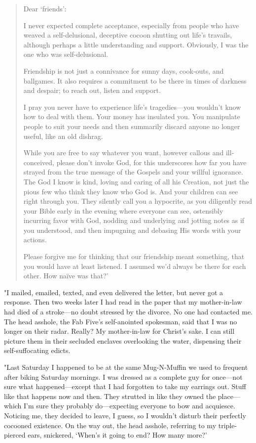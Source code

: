 \begin{quote}
Dear `friends':

I never expected complete acceptance, especially from people who have
weaved a self-delusional, deceptive cocoon shutting out life's travails,
although perhaps a little understanding and support. Obviously, I was
the one who was self-delusional.

Friendship is not just a connivance for sunny days, cook-outs, and
ballgames. It also requires a commitment to be there in times of
darkness and despair; to reach out, listen and support.

I pray you never have to experience life's tragedies---you wouldn't know
how to deal with them. Your money has insulated you. You manipulate
people to suit your needs and then summarily discard anyone no longer
useful, like an old dishrag.

While you are free to say whatever you want, however callous and
ill-conceived, please don't invoke God, for this underscores how far you
have strayed from the true message of the Gospels and your willful
ignorance. The God I know is kind, loving and caring of all his
Creation, not just the pious few who think they know who God is. And
your children can see right through you. They silently call you a
hypocrite, as you diligently read your Bible early in the evening where
everyone can see, ostensibly incurring favor with God, nodding and
underlying and jotting notes as if you understood, and then impugning
and debasing His words with your actions.

Please forgive me for thinking that our friendship meant something, that
you would have at least listened. I assumed we'd always be there for
each other. How naïve was that?'
\end{quote}

"I mailed, emailed, texted, and even delivered the letter, but never got
a response. Then two weeks later I had read in the paper that my
mother-in-law had died of a stroke---no doubt stressed by the divorce.
No one had contacted me. The head asshole, the Fab Five's self-anointed
spokesman, said that I was no longer on their radar. Really? My
mother-in-law for Christ's sake. I can still picture them in their
secluded enclaves overlooking the water, dispensing their
self-suffocating edicts.

"Last Saturday I happened to be at the same Mug-N-Muffin we used to
frequent after biking Saturday mornings. I was dressed as a complete guy
for once---not sure what happened---except that I had forgotten to take
my earrings out. Stuff like that happens now and then. They strutted in
like they owned the place---which I'm sure they probably do---expecting
everyone to bow and acquiesce. Noticing me, they decided to leave, I
guess, so I wouldn't disturb their perfectly cocooned existence. On the
way out, the head asshole, referring to my triple-pierced ears,
snickered, `When's it going to end? How many more?'

